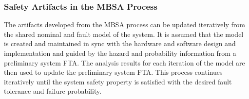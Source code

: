\subsubsection{Safety Artifacts in the MBSA Process}
The artifacts developed from the MBSA process can be updated iteratively from the shared nominal and fault model of the system. It is assumed that the model is created and maintained in sync with the hardware and software design and implementation and guided by the hazard and probability information from a preliminary system FTA. The analysis results for each iteration of the model are then used to update the preliminary system FTA. This process continues iteratively until the system safety property is satisfied with the desired fault tolerance and failure probability. 